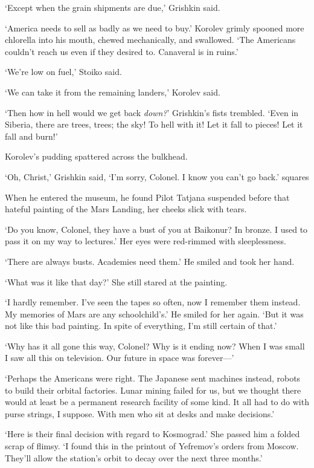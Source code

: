 `Except when the grain shipments are due,' Grishkin said.

`America needs to sell as badly as we need to buy.' Korolev grimly spooned more chlorella into his mouth, chewed mechanically, and swallowed. `The Americans couldn't reach us even if they desired to. Canaveral is in ruins.'

`We're low on fuel,' Stoiko said.

`We can take it from the remaining landers,' Korolev said.

`Then how in hell would we get back \textit{down?}' Grishkin's fists trembled. `Even in Siberia, there are trees, trees; the sky! To hell with it! Let it fall to pieces! Let it fall and burn!'

Korolev's pudding spattered across the bulkhead.

`Oh, Christ,' Grishkin said, `I'm sorry, Colonel. I know you can't go back.'
squares

When he entered the museum, he found Pilot Tatjana suspended before that hateful painting of the Mars Landing, her cheeks slick with tears.

`Do you know, Colonel, they have a bust of you at Baikonur? In bronze. I used to pass it on my way to lectures.' Her eyes were red-rimmed with sleeplessness.

`There are always busts. Academies need them.' He smiled and took her hand.

`What was it like that day?' She still stared at the painting.

`I hardly remember. I've seen the tapes so often, now I remember them instead. My memories of Mars are any schoolchild's.' He smiled for her again. `But it was not like this bad painting. In spite of everything, I'm still certain of that.'

`Why has it all gone this way, Colonel? Why is it ending now? When I was small I saw all this on television. Our future in space was forever---'

`Perhaps the Americans were right. The Japanese sent machines instead, robots to build their orbital factories. Lunar mining failed for us, but we thought there would at least be a permanent research facility of some kind. It all had to do with purse strings, I suppose. With men who sit at desks and make decisions.'

`Here is their final decision with regard to Kosmograd.' She passed him a folded scrap of flimsy. `I found this in the printout of Yefremov's orders from Moscow. They'll allow the station's orbit to decay over the next three months.'

